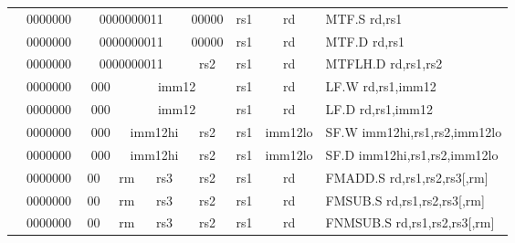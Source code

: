 \begin{table}[p]
\begin{small}
\begin{center}
\begin{tabular}{rcccccccccl}
&
\multicolumn{1}{|c|}{0000000} &
\multicolumn{5}{c|}{0000000011} &
\multicolumn{1}{c|}{00000} &
\multicolumn{1}{c|}{rs1} &
\multicolumn{1}{c|}{rd} & MTF.S rd,rs1 \\
\cline{2-10}
  

&
\multicolumn{1}{|c|}{0000000} &
\multicolumn{5}{c|}{0000000011} &
\multicolumn{1}{c|}{00000} &
\multicolumn{1}{c|}{rs1} &
\multicolumn{1}{c|}{rd} & MTF.D rd,rs1 \\
\cline{2-10}
  

&
\multicolumn{1}{|c|}{0000000} &
\multicolumn{5}{c|}{0000000011} &
\multicolumn{1}{c|}{rs2} &
\multicolumn{1}{c|}{rs1} &
\multicolumn{1}{c|}{rd} & MTFLH.D rd,rs1,rs2 \\
\cline{2-10}
  

&
\multicolumn{1}{|c|}{0000000} &
\multicolumn{2}{c|}{000} &
\multicolumn{4}{c|}{imm12} &
\multicolumn{1}{c|}{rs1} &
\multicolumn{1}{c|}{rd} & LF.W rd,rs1,imm12 \\
\cline{2-10}
  

&
\multicolumn{1}{|c|}{0000000} &
\multicolumn{2}{c|}{000} &
\multicolumn{4}{c|}{imm12} &
\multicolumn{1}{c|}{rs1} &
\multicolumn{1}{c|}{rd} & LF.D rd,rs1,imm12 \\
\cline{2-10}
  

&
\multicolumn{1}{|c|}{0000000} &
\multicolumn{2}{c|}{000} &
\multicolumn{3}{c|}{imm12hi} &
\multicolumn{1}{c|}{rs2} &
\multicolumn{1}{c|}{rs1} &
\multicolumn{1}{c|}{imm12lo} & SF.W imm12hi,rs1,rs2,imm12lo \\
\cline{2-10}
  

&
\multicolumn{1}{|c|}{0000000} &
\multicolumn{2}{c|}{000} &
\multicolumn{3}{c|}{imm12hi} &
\multicolumn{1}{c|}{rs2} &
\multicolumn{1}{c|}{rs1} &
\multicolumn{1}{c|}{imm12lo} & SF.D imm12hi,rs1,rs2,imm12lo \\
\cline{2-10}
  

&
\multicolumn{1}{|c|}{0000000} &
\multicolumn{1}{c|}{00} &
\multicolumn{2}{c|}{rm} &
\multicolumn{2}{c|}{rs3} &
\multicolumn{1}{c|}{rs2} &
\multicolumn{1}{c|}{rs1} &
\multicolumn{1}{c|}{rd} & FMADD.S rd,rs1,rs2,rs3[,rm] \\
\cline{2-10}
  

&
\multicolumn{1}{|c|}{0000000} &
\multicolumn{1}{c|}{00} &
\multicolumn{2}{c|}{rm} &
\multicolumn{2}{c|}{rs3} &
\multicolumn{1}{c|}{rs2} &
\multicolumn{1}{c|}{rs1} &
\multicolumn{1}{c|}{rd} & FMSUB.S rd,rs1,rs2,rs3[,rm] \\
\cline{2-10}
  

&
\multicolumn{1}{|c|}{0000000} &
\multicolumn{1}{c|}{00} &
\multicolumn{2}{c|}{rm} &
\multicolumn{2}{c|}{rs3} &
\multicolumn{1}{c|}{rs2} &
\multicolumn{1}{c|}{rs1} &
\multicolumn{1}{c|}{rd} & FNMSUB.S rd,rs1,rs2,rs3[,rm] \\
\cline{2-10}
  


\end{tabular}
\end{center}
\end{small}
\end{table}
